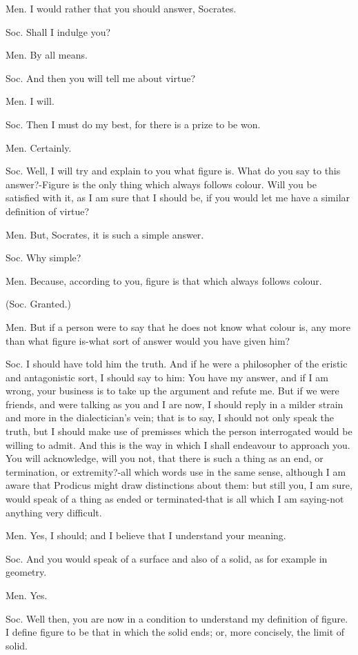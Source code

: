 Men. I would rather that you should answer, Socrates. 

Soc. Shall I indulge you? 

Men. By all means. 

Soc. And then you will tell me about virtue? 

Men. I will. 

Soc. Then I must do my best, for there is a prize to be won.

Men. Certainly. 

Soc. Well, I will try and explain to you what figure is. What do you
say to this answer?-Figure is the only thing which always follows
colour. Will you be satisfied with it, as I am sure that I should
be, if you would let me have a similar definition of virtue?

Men. But, Socrates, it is such a simple answer. 

Soc. Why simple? 

Men. Because, according to you, figure is that which always follows
colour. 

(Soc. Granted.) 

Men. But if a person were to say that he does not know what colour
is, any more than what figure is-what sort of answer would you have
given him? 

Soc. I should have told him the truth. And if he were a philosopher
of the eristic and antagonistic sort, I should say to him: You have
my answer, and if I am wrong, your business is to take up the argument
and refute me. But if we were friends, and were talking as you and
I are now, I should reply in a milder strain and more in the dialectician's
vein; that is to say, I should not only speak the truth, but I should
make use of premisses which the person interrogated would be willing
to admit. And this is the way in which I shall endeavour to approach
you. You will acknowledge, will you not, that there is such a thing
as an end, or termination, or extremity?-all which words use in the
same sense, although I am aware that Prodicus might draw distinctions
about them: but still you, I am sure, would speak of a thing as ended
or terminated-that is all which I am saying-not anything very difficult.

Men. Yes, I should; and I believe that I understand your meaning.

Soc. And you would speak of a surface and also of a solid, as for
example in geometry. 

Men. Yes. 

Soc. Well then, you are now in a condition to understand my definition
of figure. I define figure to be that in which the solid ends; or,
more concisely, the limit of solid. 

